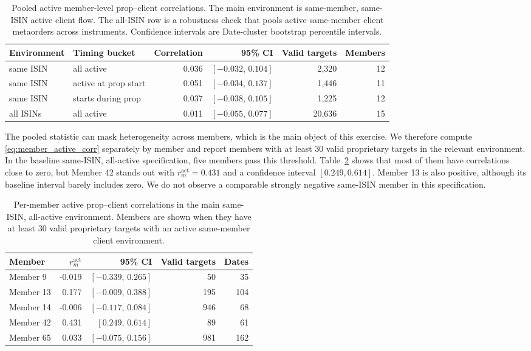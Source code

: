 \documentclass[11pt]{article}
\begin{document}
\begin{table}[t]
\centering
\scriptsize
\setlength{\tabcolsep}{4pt}
\begin{tabular}{@{}llrrrr@{}}
\toprule
Environment & Timing bucket & Correlation & 95\% CI & Valid targets & Members \\
\midrule
same ISIN & all active & 0.036 & $[-0.032,\,0.104]$ & 2,320 & 12 \\
same ISIN & active at prop start & 0.051 & $[-0.034,\,0.137]$ & 1,446 & 11 \\
same ISIN & starts during prop & 0.037 & $[-0.038,\,0.105]$ & 1,225 & 12 \\
all ISINs & all active & 0.011 & $[-0.055,\,0.077]$ & 20,636 & 15 \\
\bottomrule
\end{tabular}
\caption{Pooled active member-level prop--client correlations. The main
environment is same-member, same-ISIN active client flow. The all-ISIN row is a
robustness check that pools active same-member client metaorders across
instruments. Confidence intervals are Date-cluster bootstrap percentile
intervals.}
\label{tab:member_active_overlap_global}
\end{table}

The pooled statistic can mask heterogeneity across members, which is the main
object of this exercise. We therefore compute \eqref{eq:member_active_corr}
separately by member and report members with at least 30 valid proprietary
targets in the relevant environment. In the baseline same-ISIN, all-active
specification, five members pass this threshold. Table~\ref{tab:member_active_overlap_members}
shows that most of them have correlations close to zero, but Member 42
stands out with $r_m^{\mathrm{act}}=0.431$ and a confidence interval
$[0.249,0.614]$. Member 13 is also positive, although its baseline interval
barely includes zero. We do not observe a comparable strongly negative
same-ISIN member in this specification.

\begin{table}[t]
\centering
\scriptsize
\setlength{\tabcolsep}{4pt}
\begin{tabular}{@{}lrrrr@{}}
\toprule
Member & $r_m^{\mathrm{act}}$ & 95\% CI & Valid targets & Dates \\
\midrule
Member 9  & -0.019 & $[-0.339,\,0.265]$ & 50  & 35 \\
Member 13 &  0.177 & $[-0.009,\,0.388]$ & 195 & 104 \\
Member 14 & -0.006 & $[-0.117,\,0.084]$ & 946 & 68 \\
Member 42 &  0.431 & $[0.249,\,0.614]$  & 89  & 61 \\
Member 65 &  0.033 & $[-0.075,\,0.156]$ & 981 & 162 \\
\bottomrule
\end{tabular}
\caption{Per-member active prop--client correlations in the main same-ISIN,
all-active environment. Members are shown when they have at least 30 valid
proprietary targets with an active same-member client environment.}
\label{tab:member_active_overlap_members}
\end{table}
\end{document}
